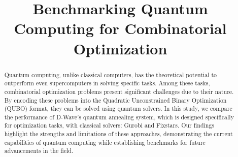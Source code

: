 \documentclass[conference]{IEEEtran}
\begin{document}
\title{Benchmarking Quantum Computing for Combinatorial Optimization\\
}

\author{
\and
{}
\and
{}
\and
{}
}

\maketitle

\begin{abstract}
Quantum computing, unlike classical computers, has the theoretical potential to outperform even supercomputers in solving specific tasks. Among these tasks, combinatorial optimization problems present significant challenges due to their nature. By encoding these problems into the Quadratic Unconstrained Binary Optimization (QUBO) format, they can be solved using quantum solvers. In this study, we compare the performance of D-Wave's quantum annealing system, which is designed specifically for optimization tasks, with classical solvers: Gurobi and Fixstars. Our findings highlight the strengths and limitations of these approaches, demonstrating the current capabilities of quantum computing while establishing benchmarks for future advancements in the field.
\end{abstract}
\end{document}
